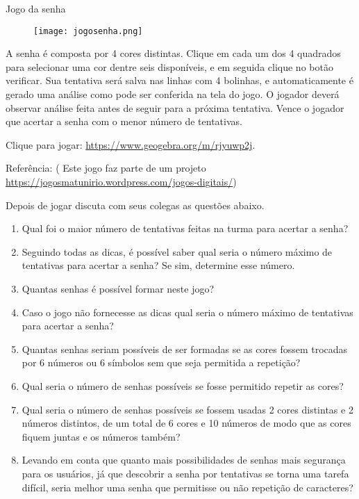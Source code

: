 
\begin{task}{Jogo da senha}

\begin{figure}[H]
\centering

\texttt{[image: jogosenha.png]}
\end{figure}

A senha é composta por 4 cores distintas. Clique em cada um dos 4 quadrados para selecionar uma cor dentre seis disponíveis, e em seguida clique no botão verificar. Sua tentativa será salva nas linhas com 4 bolinhas, e automaticamente é gerado uma análise como pode ser conferida na tela do jogo. O jogador deverá observar análise feita antes de seguir para a próxima tentativa. Vence o jogador que acertar a senha com o menor número de tentativas.



Clique para jogar: \url{https://www.geogebra.org/m/rjyuwp2j}.



Referência: ( Este jogo faz parte de um projeto
\url{https://jogosmatunirio.wordpress.com/jogos-digitais/}) 



Depois de jogar discuta com seus colegas as questões abaixo. 

\begin{enumerate}

\item Qual foi o maior número de tentativas feitas na turma para acertar a senha? 
\item Seguindo todas as dicas, é possível saber qual seria o número máximo de tentativas para acertar a senha? Se sim, determine esse número.
\item Quantas senhas é possível formar neste jogo?
\item Caso o jogo não fornecesse as dicas qual seria o número máximo de tentativas para acertar a senha?
\item Quantas senhas seriam possíveis de ser formadas se as cores fossem trocadas por 6 números ou 6 símbolos sem que seja permitida a repetição?
\item Qual seria o número de senhas possíveis se fosse permitido repetir as cores?
\item Qual seria o número de senhas possíveis se fossem usadas 2 cores distintas e 2 números distintos, de um total de 6 cores e 10 números de modo que as cores fiquem juntas e os números também?
\item Levando em conta que quanto mais possibilidades de senhas mais segurança para os usuários, já que descobrir a senha por tentativas se torna uma tarefa difícil, seria melhor uma senha que permitisse ou não repetição de caracteres?


\end{enumerate}
\end{task}
